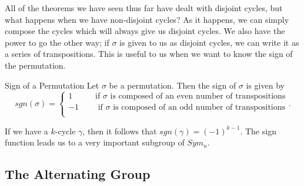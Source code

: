 All of the theorems we have seen thus far have dealt with disjoint cycles, but what happens when we have non-disjoint cycles? As it happens, we can simply compose the cycles which will always give us disjoint cycles. We also have the power to go the other way; if $\sigma$ is given to us as disjoint cycles, we can write it as a series of transpositions. This is useful to us when we want to know the sign of the permutation.

\begin{definition}{Sign of a Permutation}
    Let $\sigma$ be a permutation. Then the sign of $\sigma$ is given by
    \[
        sgn(\sigma)=
        \begin{cases}
            1 \qquad\ \ \text{ if }\sigma\text{ is composed of an even number of transpositions}\\
            -1 \qquad \text{ if }\sigma\text{ is composed of an odd number of transpositions}\\
        \end{cases}.
    \]
\end{definition}
If we have a $k$-cycle $\gamma$, then it follows that $sgn(\gamma)=(-1)^{k-1}$. The sign function leads us to a very important subgroup of $Sym_{n}$.

\subsection*{The Alternating Group}

